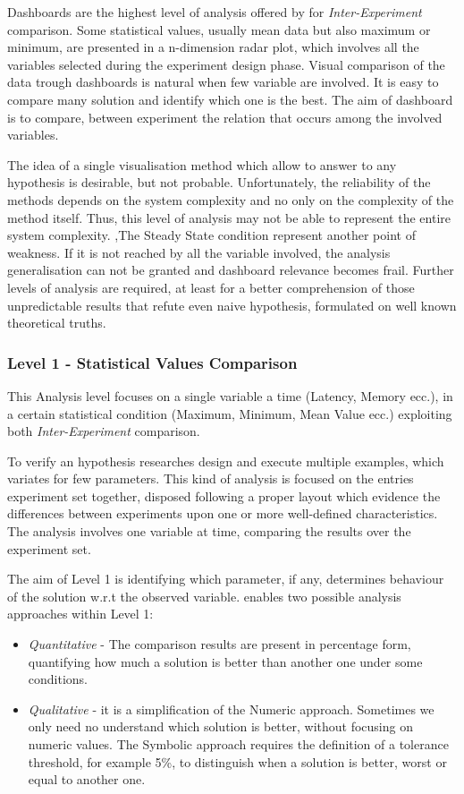 Dashboards are the highest level of analysis offered by \name for \textit{Inter-Experiment} comparison. Some statistical values, usually mean data but also maximum or minimum, are presented in a n-dimension radar plot, which involves all the variables selected during the experiment design phase. Visual comparison of the data trough dashboards is natural when few variable are involved. It is easy to compare many solution and identify which one is the best. The aim of dashboard is to compare, between experiment the relation that occurs among the involved variables.

The idea of a single visualisation method which allow to answer to any hypothesis is desirable, but not probable.  Unfortunately, the reliability of the methods depends on the system complexity and no only on the complexity of the method itself. Thus, this level of analysis may not be able to represent the entire system complexity. ,The Steady State condition represent another point of weakness. If it is not reached by all the variable involved, the analysis generalisation can not be granted and dashboard relevance becomes frail. Further levels of analysis are required, at least for a better comprehension of those unpredictable results that refute even naive hypothesis, formulated on well known theoretical truths.

\subsubsection{Level 1 -  Statistical Values Comparison}\label{sec:heaven-level1}

This Analysis level focuses on a single variable a time (Latency, Memory ecc.), in a certain statistical condition (Maximum, Minimum, Mean Value ecc.) exploiting both \textit{Inter-Experiment} comparison. 

To verify an hypothesis researches design and execute multiple examples, which variates for few parameters.  This kind of analysis is focused on the entries experiment set together, disposed following a proper layout which evidence the differences between experiments upon one or more well-defined characteristics. The analysis involves one variable at time, comparing the results over the experiment set. 

The aim of Level 1 is identifying which parameter, if any, determines behaviour of the solution w.r.t the observed variable. \name enables two possible analysis approaches within Level 1:
\begin{itemize}
\item \textit{Quantitative} -  The comparison results are present in percentage form, quantifying how much a solution is better than another one under some conditions. 
\item \textit{Qualitative} - it is a simplification of the Numeric approach. Sometimes we only need no understand which solution is better, without focusing on numeric values. The Symbolic approach requires the definition of a tolerance threshold, for example 5\%, to distinguish when a solution is better, worst or equal to another one.
\end{itemize}

